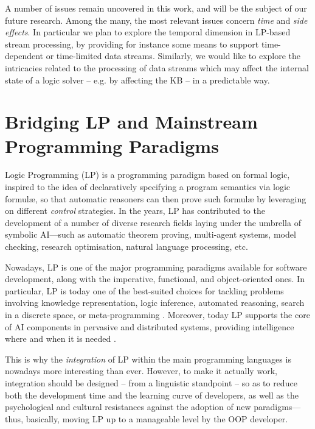 \documentclass[12pt,a4paper,openright,twoside]{book}
\begin{document}
A number of issues remain uncovered in this work, and will be the subject of our future research.
%
Among the many, the most relevant issues concern \emph{time} and \emph{side effects}.
%
In particular we plan to explore the temporal dimension in LP-based stream processing, by providing for instance some means to support time-dependent or time-limited data streams.
%
Similarly, we would like to explore the intricacies related to the processing of data streams which may affect the internal state of a logic solver -- e.g. by affecting the KB -- in a predictable way.

\chapter{Bridging LP and Mainstream Programming Paradigms}


Logic Programming (LP) \cite{Apt2001,Kowalski1974} is a programming pa\-ra\-di\-gm based on formal logic, inspired to the idea of declaratively specifying a program semantics via logic formul\ae{}, so that automatic reasoners can then prove such formul\ae{} by leveraging on different \emph{control} strategies.
%
In the years, LP has contributed to the development of a number of diverse research fields laying under the umbrella of symbolic AI---such as automatic theorem proving, multi-agent systems, model checking, research optimisation, natural language processing, etc.

Nowadays, LP is one of the major programming pa\-ra\-di\-gms available for software development, along with the imperative, functional, and object-oriented ones.
%
In particular, LP is today one of the best-suited choices for tackling problems involving knowledge representation, logic inference, automated reasoning, search in a discrete space, or meta-programming \cite{logictech-information11}.
%
Moreover, today LP supports the core of AI components in pervasive and distributed systems, providing intelligence where and when it is needed \cite{microintelligencelp-mmasII}.

This is why the \emph{integration} of LP within the main programming languages is  nowadays more interesting than ever.
%
However, to make it actually work, integration should be designed -- from a linguistic standpoint -- so as to reduce both the development time and the learning curve of developers, as well as the psychological and cultural resistances against the adoption of new paradigms---thus, basically, moving LP up to a manageable level by the OOP developer.
\end{document}
